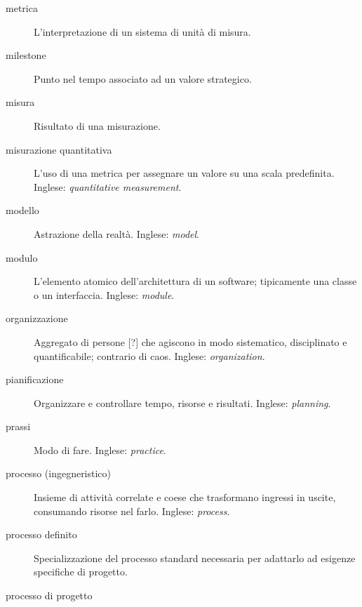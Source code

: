 \documentclass[a4paper]{article}
\begin{document}
\begin{description}
	\item[metrica] 

			L'interpretazione di un sistema di unità di misura.
			
	\item[milestone] 

			Punto nel tempo associato ad un valore strategico.
			
	\item[misura] 

			Risultato di una misurazione.
			
	\item[misurazione quantitativa] 

			L'uso di una metrica per assegnare un valore su una scala predefinita. Inglese: \emph{quantitative measurement}.
			
	\item[modello] 

			Astrazione della realtà. Inglese: \emph{model}.
			
	\item[modulo] 

			L'elemento atomico dell'architettura di un software; tipicamente una classe o un interfaccia. Inglese: \emph{module}.
			
	\item[organizzazione] 

			Aggregato di persone [?] che agiscono in modo sistematico, disciplinato e quantificabile; contrario di caos. Inglese: \emph{organization}.
			
	\item[pianificazione] 

			Organizzare e controllare tempo, risorse e risultati. Inglese: \emph{planning}.
			
	\item[prassi] 

			Modo di fare. Inglese: \emph{practice}.
			
	\item[processo (ingegneristico)] 

			Insieme di attività correlate e coese che trasformano ingressi in uscite, consumando risorse nel farlo. Inglese: \emph{process}.
			
	\item[processo definito] 

			Specializzazione del processo standard necessaria per adattarlo ad esigenze specifiche di progetto.
			
	\item[processo di progetto] 


\end{description}
\end{document}
